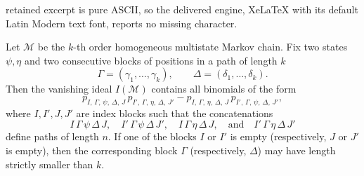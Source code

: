 \documentclass[10pt,a4paper]{amsart}
\begin{document}
retained excerpt is pure ASCII, so the delivered engine, XeLaTeX with its default Latin Modern text font, reports no missing character.
\begin{proposition}
\label{prop:homogeneous binomials}
Let $\mathcal M$ be the $k$-th order homogeneous multistate Markov chain.
Fix two states $\psi,\eta$ and two consecutive blocks of positions in a path of length $k$
\[
\Gamma=(\gamma_1,\ldots,\gamma_k), \qquad
\Delta=(\delta_1,\ldots,\delta_k).
\]
Then the vanishing ideal $I(\mathcal M)$ contains all binomials of the form
\[
p_{I,\,\Gamma,\,\psi,\,\Delta,\,J}\,
p_{I',\,\Gamma,\,\eta,\,\Delta,\,J'}
-
p_{I,\,\Gamma,\,\eta,\,\Delta,\,J}\,
p_{I',\,\Gamma,\,\psi,\,\Delta,\,J'},
\]
where $I,I',J,J'$ are index blocks such that the concatenations
\[
I\,\Gamma\,\psi\,\Delta\,J,\quad
I'\,\Gamma\,\psi\,\Delta\,J',\quad
I\,\Gamma\,\eta\,\Delta\,J,\quad
\text{and}\quad
I'\,\Gamma\,\eta\,\Delta\,J'
\]
define paths of length $n$.
If one of the blocks $I$ or $I'$ is empty (respectively, $J$ or $J'$ is empty),
then the corresponding block $\Gamma$ (respectively, $\Delta$) 
may have length strictly smaller than $k$.
\end{proposition}
\end{document}
